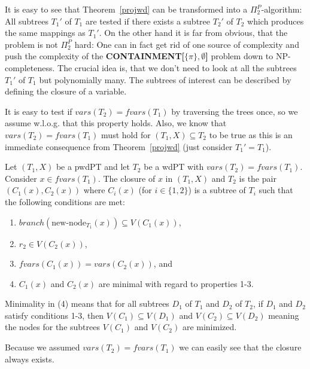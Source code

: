 It is easy to see that Theorem~\ref{projwd} can be transformed into a
$\Pi^P_2$-algorithm: All subtrees $T_1'$ of $T_1$ are tested if there
exists a subtree $T_2'$ of $T_2$ which produces the same mappings as $T_1'$.
On the other hand it is far from obvious, 
that the problem is not $\Pi^P_2$ hard: One can in fact
get rid of one source of complexity and push the complexity of the
\textbf{CONTAINMENT[$\{\pi\},\emptyset$]} problem down to
NP-completeness.
The crucial idea is, that we don't need to look at all the subtrees $T_1'$ of
$T_1$ but polynomially many. The subtrees of interest can be described by
defining the closure of a variable.

It is easy to test if $vars(T_2) = fvars(T_1)$ by traversing the trees once, so
we assume w.l.o.g. that this property holds. Also, we know that $vars(T_2) =
fvars(T_1)$ must hold for $(T_1,X) \subseteq T_2$ to be true as this is an
immediate consequence from Theorem~\ref{projwd} (just consider $T_1' = T_1$).

\begin{definition}
	Let $(T_1,X)$ be a pwdPT and let $T_2$ be a wdPT with
	$vars(T_2) = fvars(T_1)$. Consider $x \in fvars(T_1)$. The closure
	of $x$ in $(T_1,X)$ and $T_2$ is the pair $(C_1(x),C_2(x))$ where
	$C_i(x)$ (for $i \in \{1,2\}$) is a subtree of $T_i$ such that the
	following conditions are met:
	\begin{enumerate}
		\item $branch(\mbox{new-node}_{T_1}(x)) \subseteq V(C_1(x))$,
		\item $r_2 \in V(C_2(x))$,
		\item $fvars(C_1(x)) = vars(C_2(x))$, and
		\item $C_1(x)$ and $C_2(x)$ are minimal with regard to properties 1-3.
	\end{enumerate}
	Minimality in (4) means that for all subtrees $D_1$ of $T_1$ and $D_2$ of
	$T_2$, if $D_1$ and $D_2$ satisfy conditions 1-3, then $V(C_1) \subseteq
	V(D_1)$ and $V(C_2) \subseteq V(D_2)$ meaning the nodes for the subtrees
	$V(C_1)$ and $V(C_2)$ are minimized.
\end{definition}

Because we assumed $vars(T_2) = fvars(T_1)$ we can easily see that the closure
always exists. 

